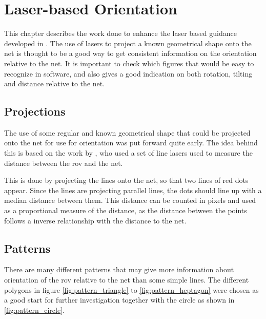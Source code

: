 

\chapter{Laser-based Orientation}
This chapter describes the work done to enhance the laser based guidance developed in \citet{carlsen10}. The 
use of lasers to project a known geometrical shape onto the net is thought to be a good way to get consistent 
information on the orientation relative to the net. It is important to check which figures that would be easy 
to recognize in software, and also gives a good indication on both rotation, tilting and distance relative to the net. 

\section{Projections}
The use of some regular and known geometrical shape that could be projected onto the net for use for orientation 
was put forward quite early. The idea behind this is based on the work by \citet{carlsen10}, who used 
a set of line lasers used to measure the distance between the \gls{rov} and the net. 

This is 
done by projecting the lines onto the net, so that two lines of red dots 
appear. Since the lines are projecting parallel lines, the dots should line up with 
a median distance between them. This distance can be counted in pixels and used as a 
proportional measure of the distance, as the distance between the points follows a inverse 
relationship with the distance to the net.

\section{Patterns}
There are many different patterns that may give more information about 
orientation of the \gls{rov} relative to the net than some simple lines. The 
different polygons in figure \vref{fig:pattern_triangle} to \vref{fig:pattern_heptagon}
were chosen as a good start for further investigation together with the 
circle as shown in \vref{fig:pattern_circle}.

